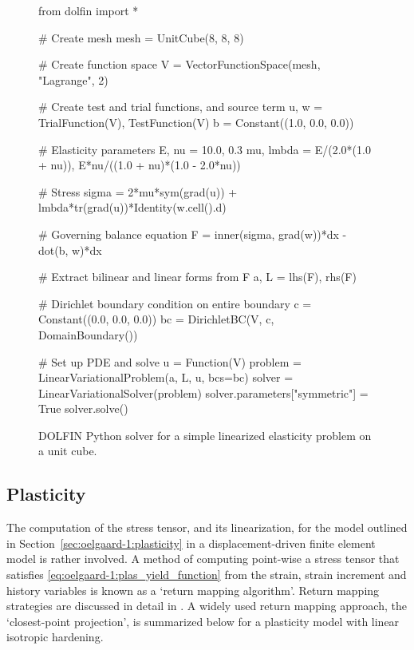 \begin{figure}
\bwfig
\begin{python}
from dolfin import *

# Create mesh
mesh = UnitCube(8, 8, 8)

# Create function space
V = VectorFunctionSpace(mesh, "Lagrange", 2)

# Create test and trial functions, and source term
u, w = TrialFunction(V), TestFunction(V)
b = Constant((1.0, 0.0, 0.0))

# Elasticity parameters
E, nu = 10.0, 0.3
mu, lmbda = E/(2.0*(1.0 + nu)), E*nu/((1.0 + nu)*(1.0 - 2.0*nu))

# Stress
sigma = 2*mu*sym(grad(u)) + lmbda*tr(grad(u))*Identity(w.cell().d)

# Governing balance equation
F = inner(sigma, grad(w))*dx - dot(b, w)*dx

# Extract bilinear and linear forms from F
a, L = lhs(F), rhs(F)

# Dirichlet boundary condition on entire boundary
c  = Constant((0.0, 0.0, 0.0))
bc = DirichletBC(V, c, DomainBoundary())

# Set up PDE and solve
u = Function(V)
problem = LinearVariationalProblem(a, L, u, bcs=bc)
solver = LinearVariationalSolver(problem)
solver.parameters["symmetric"] = True
solver.solve()
\end{python}
\caption{DOLFIN Python solver for a simple linearized elasticity problem
on a unit cube.}
\label{fig:oelgaard-1:elas_code}
\end{figure}

\subsection{Plasticity}
\label{sec:oelgaard-1:examples_plasticity}

The computation of the stress tensor, and its linearization,
for the model outlined in Section~\ref{sec:oelgaard-1:plasticity}
in a displacement-driven finite element model is rather involved.
A method of computing point-wise a stress tensor that satisfies
\eqref{eq:oelgaard-1:plas_yield_function} from the strain, strain
increment and history variables is known as a `return mapping
algorithm'.  Return mapping strategies are discussed in detail in
\citet{SimoHughes1998}.  A widely used return mapping approach, the
`closest-point projection', is summarized below for a plasticity model
with linear isotropic hardening.

